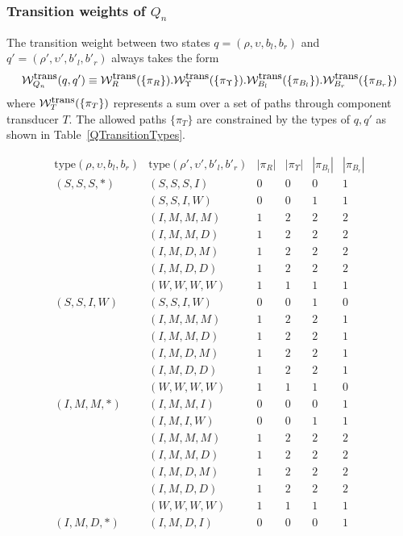 \documentclass{article}
\newcommand\idfork{\Upsilon}
\newcommand\weight{{\cal W}}
\newcommand\weightfunof[1]{\weight_{#1}}
\newcommand\transweightfun[1]{\weightfunof{#1}^{\mbox{\small trans}}}
\newcommand\sumoverpaths[1]{\transweightfun{#1}(\{\pi_{#1}\})}
\newcommand\statetype{\mbox{type}}
\newcommand\qstate{(\rho,\upsilon,b_l,b_r)}
\newcommand\qstatedest{(\rho',\upsilon',b'_l,b'_r)}
\begin{document}
\subsubsection{Transition weights of $Q_n$}
The transition weight between two states
$q=\qstate$ and
$q'=\qstatedest$
always takes the form
\[
\transweightfun{Q_n}(q,q') \equiv \sumoverpaths{R} . \sumoverpaths{\idfork} . \sumoverpaths{B_l} . \sumoverpaths{B_r}
\]
where $\sumoverpaths{T}$ represents a sum over a set of paths through component transducer $T$.
The allowed paths $\{\pi_T\}$ are constrained by the types of $q,q'$ as shown in Table~\ref{QTransitionTypes}.
\begin{table}
\[
\begin{array}{ll|cccc}
\statetype\qstate & \statetype\qstatedest & |\pi_R| & |\pi_{\idfork}| & |\pi_{B_l}| & |\pi_{B_r}| \\
\hline
(S,S,S,*) & (S,S,S,I) & 0 & 0 & 0 & 1 \\
          & (S,S,I,W) & 0 & 0 & 1 & 1 \\
          & (I,M,M,M) & 1 & 2 & 2 & 2 \\
          & (I,M,M,D) & 1 & 2 & 2 & 2 \\
          & (I,M,D,M) & 1 & 2 & 2 & 2 \\
          & (I,M,D,D) & 1 & 2 & 2 & 2 \\
          & (W,W,W,W) & 1 & 1 & 1 & 1 \\
\hline
(S,S,I,W) & (S,S,I,W) & 0 & 0 & 1 & 0 \\
          & (I,M,M,M) & 1 & 2 & 2 & 1 \\
          & (I,M,M,D) & 1 & 2 & 2 & 1 \\
          & (I,M,D,M) & 1 & 2 & 2 & 1 \\
          & (I,M,D,D) & 1 & 2 & 2 & 1 \\
          & (W,W,W,W) & 1 & 1 & 1 & 0 \\
\hline
(I,M,M,*) & (I,M,M,I) & 0 & 0 & 0 & 1 \\
          & (I,M,I,W) & 0 & 0 & 1 & 1 \\
          & (I,M,M,M) & 1 & 2 & 2 & 2 \\
          & (I,M,M,D) & 1 & 2 & 2 & 2 \\
          & (I,M,D,M) & 1 & 2 & 2 & 2 \\
          & (I,M,D,D) & 1 & 2 & 2 & 2 \\
          & (W,W,W,W) & 1 & 1 & 1 & 1 \\
\hline
(I,M,D,*) & (I,M,D,I) & 0 & 0 & 0 & 1 \\

\end{array}\]
\end{table}
\end{document}
